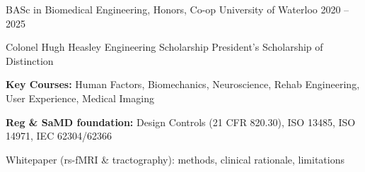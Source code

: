\documentclass[11pt, a4paper]{russell}
\begin{document}
\makecvheader

\begin{cventries}
    \cventry
        {BASc in Biomedical Engineering, Honors, Co-op} %
        {University of Waterloo} %
        {} %
        {2020 -- 2025} %
        {
          \begin{cvitems}
            \item {Colonel Hugh Heasley Engineering Scholarship \textbar{} President's Scholarship of Distinction}
            \item {\textbf{Key Courses:} Human Factors, Biomechanics, Neuroscience, Rehab Engineering, User Experience, Medical Imaging}
            \item {\textbf{Reg \& SaMD foundation:} Design Controls (21 CFR 820.30), ISO 13485, ISO 14971, IEC 62304/62366}
            \item {Whitepaper (rs-fMRI \& tractography): methods, clinical rationale, limitations}
          \end{cvitems}
        }
\end{cventries}
\end{document}
